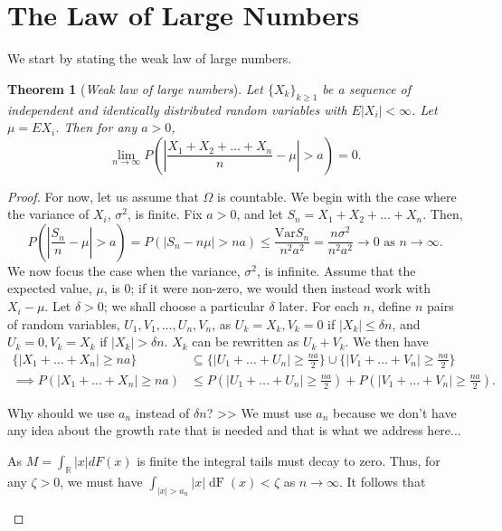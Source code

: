 \documentclass[15pt,a4paper]{book}
\newtheorem{theorem}{Theorem}[chapter]
\theoremstyle{definition}
\newcommand{\eax}[1]{\emph{#1}\index{#1}} %
\newcommand{\abs}[1]{\left| #1 \right|} %
\begin{document}
\section{The Law of Large Numbers}

We start by stating the weak law of large numbers.
\begin{theorem}[\eax{Weak law of large numbers}]
    Let $\{X_{k}\}_{k \geq 1}$ be a sequence of independent and identically distributed random variables with $E\abs{X_{i}} < \infty$. Let $\mu = EX_{i}$. Then for any $a > 0$,
    \begin{equation}
        \lim_{n \to \infty} P\left(\abs{\frac{X_{1}+X_{2}+\ldots+X_{n}}{n} - \mu} > a \right) = 0.
    \end{equation} 
\end{theorem}
\begin{proof}
    For now, let us assume that $\Omega$ is countable. We begin with the case where the variance of $X_{i}$, $\sigma^{2}$, is finite. Fix $a > 0$, and let $S_{n} = X_{1} + X_{2} + \ldots + X_{n}$. Then,
    \begin{equation}
        P\left(\abs{\frac{S_{n}}{n} - \mu} > a\right) = P(\abs{S_{n}-n\mu} > na) \leq \frac{\text{Var}S_{n}}{n^{2}a^{2}} = \frac{n\sigma^{2}}{n^{2}a^{2}} \to 0 \text{ as } n \to \infty.
    \end{equation}
    We now focus the case when the variance, $\sigma^{2}$, is infinite. Assume that the expected value, $\mu$, is 0; if it were non-zero, we would then instead work with $X_{i}-\mu$. Let $\delta > 0$; we shall choose a particular $\delta$ later. For each $n$, define $n$ pairs of random variables, $U_{1},V_{1}, \ldots, U_{n},V_{n}$, as $U_{k} = X_{k}, V_{k} = 0$ if $\abs{X_{k}} \leq \delta n$, and $U_{k} = 0, V_{k} = X_{k}$ if $\abs{X_{k}} > \delta n$. $X_{k}$ can be rewritten as $U_{k} + V_{k}$. We then have
    \begin{align}
        \{\abs{X_{1} + \ldots + X_{n}} \geq na\} &\subseteq \{\abs{U_{1} + \ldots + U_{n}} \geq \frac{na}{2}\} \cup \{\abs{V_{1} + \ldots + V_{n}} \geq \frac{na}{2}\} \\
        \implies P\left(\abs{X_{1} + \ldots + X_{n}} \geq na\right) &\leq P\left(\abs{U_{1} + \ldots + U_{n}} \geq \frac{na}{2}\right) + P\left(\abs{V_{1} + \ldots + V_{n}} \geq \frac{na}{2}\right).
    \end{align}

    \begin{mainbox}
        {Why should we use $a_n$ instead of $\delta n$?}
        >> We must use $a_n$ because we don't have any idea about the growth rate that is needed and that is what we address here...
        \end{mainbox}
        \vspace{1em}
        \begin{tcolorbox}[title=Analysis on $a_n$...,colback=blue!2!white,colframe=blue!55!black]
        As $M=\int_{\mathbb{R}}|x| d F(x)$ is finite the integral tails must decay to zero. Thus, for any $\zeta>0$, we must have $\int_{|x|>a_{n}}|x| \operatorname{dF}(x)<\zeta$ as $n \rightarrow \infty$. It follows that
        

\end{tcolorbox}
\end{proof}
\end{document}
